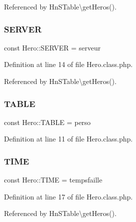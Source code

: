 Referenced by Hn\+S\+Table\textbackslash{}get\+Heros().

\mbox{\label{class_hero_ae65c017ecc28b2d2f913a990b1c69ed3}} 
\subsubsection{\texorpdfstring{S\+E\+R\+V\+ER}{SERVER}}
{\footnotesize\ttfamily const Hero\+::\+S\+E\+R\+V\+ER = \textquotesingle{}serveur\textquotesingle{}}



Definition at line 14 of file Hero.\+class.\+php.



Referenced by Hn\+S\+Table\textbackslash{}get\+Heros().

\mbox{\label{class_hero_a8d9eaf8f96fa6331b9a02388c9a4ccfb}} 
\subsubsection{\texorpdfstring{T\+A\+B\+LE}{TABLE}}
{\footnotesize\ttfamily const Hero\+::\+T\+A\+B\+LE = \textquotesingle{}perso\textquotesingle{}}



Definition at line 11 of file Hero.\+class.\+php.

\mbox{\label{class_hero_ac567982b8c3e995a07db079d054b5c69}} 
\subsubsection{\texorpdfstring{T\+I\+ME}{TIME}}
{\footnotesize\ttfamily const Hero\+::\+T\+I\+ME = \textquotesingle{}tempsfaille\textquotesingle{}}



Definition at line 17 of file Hero.\+class.\+php.



Referenced by Hn\+S\+Table\textbackslash{}get\+Heros().

\mbox{\label{class_hero_ab15e50326f1f05174b01acf89b54626c}} 
